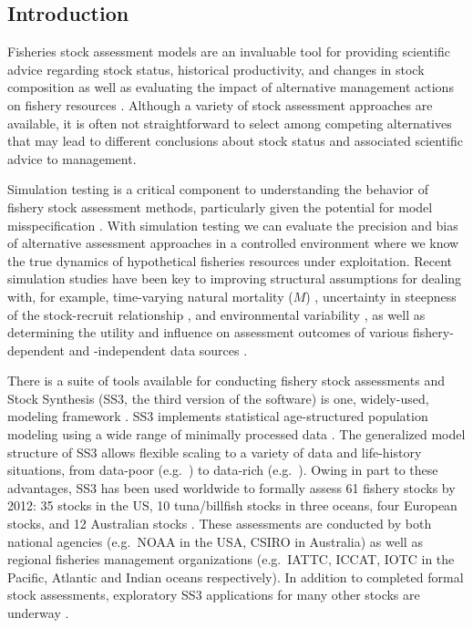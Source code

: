 \documentclass[11pt]{article}
\begin{document}
\begin{spacing}{1.2}
\clearpage
\section*{Introduction}

Fisheries stock assessment models are an invaluable tool for providing
scientific advice regarding stock status, historical productivity, and
changes in stock composition as well as evaluating the impact of alternative
management actions on fishery resources \cite{gulland1983, hilborn1992}.
Although a variety of stock assessment approaches are available, it is often
not straightforward to select among competing alternatives that may lead
to different conclusions about stock status and associated scientific
advice to management.

Simulation testing is a critical component to understanding the behavior of
fishery stock assessment methods, particularly given the potential for model
misspecification \cite{hilborn1987, hilborn1992, rosenberg1994, peterman2004,
  deroba2014}. With simulation testing we can evaluate the precision and bias
of alternative assessment approaches in a controlled environment where we know
the true dynamics of hypothetical fisheries resources under exploitation.
Recent simulation studies have been key to improving structural
assumptions for dealing with, for example, time-varying natural mortality ($M$)
\cite{lee2011, jiao2012, deroba2013, johnson2014}, uncertainty in
steepness of the stock-recruit relationship \cite{lee2012}, and environmental
variability \cite{schirripa2009}, as well as determining the utility and
influence on assessment outcomes of various fishery-dependent and -independent
data sources \cite{magnusson2007, wetzel2011a, ono2014, yin2004}.

There is a suite of tools available for conducting fishery stock
assessments and Stock Synthesis (SS3, the third version of the software) is
one, widely-used, modeling framework \cite{methot2013}. SS3 implements
statistical age-structured population modeling using a wide range of minimally
processed data \cite{maunder2013, methot2013}. The generalized model
structure of SS3 allows flexible scaling to a variety of data and life-history
situations, from data-poor (e.g.~\cite{wetzel2011a, cope2013}) to
data-rich (e.g.~\cite{haltuch2013}). Owing in part to these advantages,
SS3 has been used worldwide to formally assess 61 fishery stocks by 2012:
35 stocks in the US, 10 tuna/billfish stocks in three oceans, four European
stocks, and 12 Australian stocks \cite{methot2013}. These assessments are
conducted by both national agencies (e.g.~NOAA in the USA, CSIRO in Australia)
as well as regional fisheries management organizations (e.g.~IATTC, ICCAT, IOTC
in the Pacific, Atlantic and Indian oceans respectively). In addition to
completed formal stock assessments, exploratory SS3 applications for many other
stocks are underway \cite{methot2013}.


\end{spacing}
\end{document}
